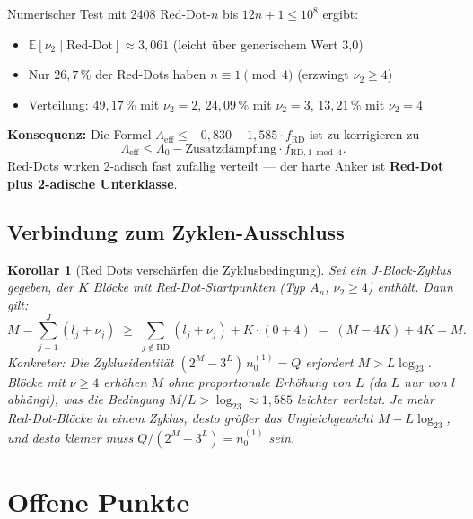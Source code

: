 \documentclass[12pt,a4paper]{article}
\newtheorem{korollar}[definition]{Korollar}
\newcommand{\vii}{\nu_2}
\newcommand{\logt}{\log_2}
\begin{document}
\begin{tcolorbox}[colback=yellow!5, colframe=orange!70!black, fonttitle=\bfseries,
  title={[!]\; Numerische Korrektur (16.\ Juni 2026)}]
Numerischer Test mit 2408 Red-Dot-$n$ bis $12n+1 \le 10^8$ ergibt:
\begin{itemize}
\item $\mathbb{E}[\nu_2 \mid \text{Red-Dot}] \approx 3{,}061$ (leicht über generischem Wert 3,0)
\item Nur $26{,}7\,\%$ der Red-Dots haben $n \equiv 1 \pmod{4}$ (erzwingt $\nu_2 \ge 4$)
\item Verteilung: $49{,}17\,\%$ mit $\nu_2=2$, $24{,}09\,\%$ mit $\nu_2=3$, $13{,}21\,\%$ mit $\nu_2=4$
\end{itemize}

\textbf{Konsequenz:} Die Formel $\Lambda_{\mathrm{eff}} \le -0{,}830 - 1{,}585 \cdot f_{\mathrm{RD}}$ ist zu korrigieren zu
\[
\Lambda_{\mathrm{eff}} \le \Lambda_0 - \text{Zusatzdämpfung} \cdot f_{\mathrm{RD},1\bmod 4}.
\]
Red-Dots wirken 2-adisch fast zufällig verteilt --- der harte Anker ist \textbf{Red-Dot plus 2-adische Unterklasse}.
\end{tcolorbox}

\subsection{Verbindung zum Zyklen-Ausschluss}

\begin{korollar}[Red Dots verschärfen die Zyklusbedingung]
\label{kor:zyklen}
Sei ein $J$-Block-Zyklus gegeben, der $K$ Blöcke mit Red-Dot-Startpunkten
(Typ $A_n$, $\vii \geq 4$) enthält. Dann gilt:
\[
  M = \sum_{j=1}^J (l_j + \nu_j)
  \;\geq\;
  \sum_{j \notin \mathrm{RD}} (l_j + \nu_j) + K \cdot (0 + 4)
  \;=\;
  (M - 4K) + 4K = M.
\]
Konkreter: Die Zyklusidentität $(2^M - 3^L)\,n_0^{(1)} = Q$
erfordert $M > L\logt 3$. Blöcke mit $\nu \geq 4$ erhöhen $M$ ohne
proportionale Erhöhung von $L$ (da $L$ nur von $l$ abhängt), was
die Bedingung $M/L > \logt 3 \approx 1{,}585$ leichter verletzt.
Je mehr Red-Dot-Blöcke in einem Zyklus, desto \emph{größer} das Ungleichgewicht
$M - L\logt 3$, und desto \emph{kleiner} muss $Q/(2^M-3^L) = n_0^{(1)}$ sein.
\end{korollar}

\section{Offene Punkte}
\label{sec:offen}
\end{document}
